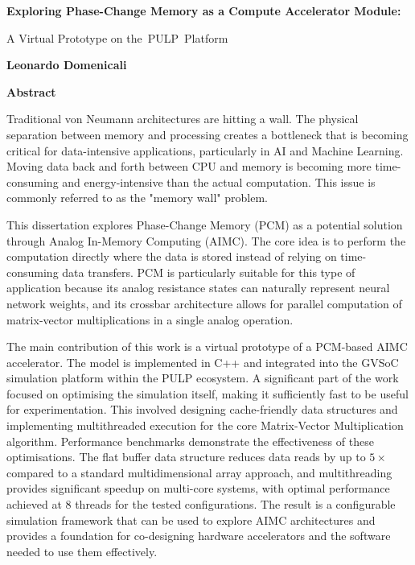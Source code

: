 
\thispagestyle{plain}
\begin{center}
    \Large
    \textbf{Exploring Phase-Change Memory as a Compute Accelerator Module:}
        
    \vspace{0.4cm}
    \large
    A Virtual Prototype on the PULP Platform
        
    \vspace{0.4cm}
    \textbf{Leonardo Domenicali}
       
    \vspace{0.9cm}
    \textbf{Abstract}
\end{center}

Traditional von Neumann architectures are hitting a wall.
The physical separation between memory and processing creates a bottleneck that is becoming critical for data-intensive applications, particularly in AI and Machine Learning.
Moving data back and forth between CPU and memory is becoming more time-consuming and energy-intensive than the actual computation. This issue is commonly referred to as the "memory wall" problem.

This dissertation explores Phase-Change Memory (PCM) as a potential solution through Analog In-Memory Computing (AIMC).
The core idea is to perform the computation directly where the data is stored instead of relying on time-consuming data transfers.
PCM is particularly suitable for this type of application because its analog resistance states can naturally represent neural network weights, and its crossbar architecture allows for parallel computation of matrix-vector multiplications in a single analog operation.

The main contribution of this work is a virtual prototype of a PCM-based AIMC accelerator. 
The model is implemented in C++ and integrated into the GVSoC simulation platform within the PULP ecosystem.
A significant part of the work focused on optimising the simulation itself, making it sufficiently fast to be useful for experimentation.
This involved designing cache-friendly data structures and implementing multithreaded execution for the core Matrix-Vector Multiplication algorithm.
Performance benchmarks demonstrate the effectiveness of these optimisations.
The flat buffer data structure reduces data reads by up to $5\times$ compared to a standard multidimensional array approach, 
and multithreading provides significant speedup on multi-core systems, with optimal performance achieved at 8 threads for the tested configurations.
The result is a configurable simulation framework that can be used to explore AIMC architectures and provides a foundation for co-designing hardware accelerators and the software needed to use them effectively.
